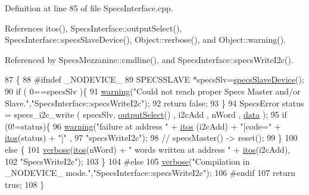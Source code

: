 Definition at line 85 of file Specs\+Interface.\+cpp.



References itos(), Specs\+Interface\+::output\+Select(), Specs\+Interface\+::specs\+Slave\+Device(), Object\+::verbose(), and Object\+::warning().



Referenced by Specs\+Mezzanine\+::cmdline(), and Specs\+Interface\+::specs\+Write\+I2c().


\begin{DoxyCode}
87                                           \{
88 \textcolor{preprocessor}{#ifndef \_NODEVICE\_
}
89   SPECSSLAVE *specsSlv=\hyperlink{classSpecsInterface_ac8d4711197f484f055533ec1e5ae01a1}{specsSlaveDevice}();
90   \textcolor{keywordflow}{if} ( 0==specsSlv )\{
91     \hyperlink{classObject_a65cd4fda577711660821fd2cd5a3b4c9}{warning}(\textcolor{stringliteral}{"Could not reach proper Specs Master and/or Slave."},\textcolor{stringliteral}{"SpecsInterface::specsWriteI2c"});
92     \textcolor{keywordflow}{return} \textcolor{keyword}{false};
93   \}
94   SpecsError status = specs\_i2c\_write ( specsSlv, \hyperlink{classSpecsInterface_ab291ed03f4c2f0143e14c26ad5f648dd}{outputSelect}() , i2cAdd , nWord , 
      \hyperlink{namespaceshell_a5ea2525995cedc3efd69ea8a7f034d1e}{data} );
95   \textcolor{keywordflow}{if} (0!=status)\{
96     \hyperlink{classObject_a65cd4fda577711660821fd2cd5a3b4c9}{warning}(\textcolor{stringliteral}{"failure at address "} + \hyperlink{Tools_8h_af330027dbdafb9a30768b3613c553e60}{itos} (i2cAdd) + \textcolor{stringliteral}{"[code="} + \hyperlink{Tools_8h_af330027dbdafb9a30768b3613c553e60}{itos}(status) + \textcolor{stringliteral}{"]"} ,
97             \textcolor{stringliteral}{"specsWriteI2c"});
98     \textcolor{comment}{//    specsMaster() -> reset();}
99   \}
100   \textcolor{keywordflow}{else} \{
101     \hyperlink{classObject_a83d2db2df682907ea1115ad721c1c4a1}{verbose}(\hyperlink{Tools_8h_af330027dbdafb9a30768b3613c553e60}{itos}(nWord) + \textcolor{stringliteral}{" words written at address "} + \hyperlink{Tools_8h_af330027dbdafb9a30768b3613c553e60}{itos}(i2cAdd),
102             \textcolor{stringliteral}{"SpecsWriteI2c"});
103   \}
104 \textcolor{preprocessor}{#else
}
105   \hyperlink{classObject_a83d2db2df682907ea1115ad721c1c4a1}{verbose}(\textcolor{stringliteral}{"Compilation in \_NODEVICE\_ mode."},\textcolor{stringliteral}{"SpecsInterface::specsWriteI2c"});
106 \textcolor{preprocessor}{#endif
}
107   \textcolor{keywordflow}{return} \textcolor{keyword}{true};
108 \}
\end{DoxyCode}
\mbox{\label{classSpecsInterface_a00c49357f1f60e3e50de9a51fa127b79}} 
